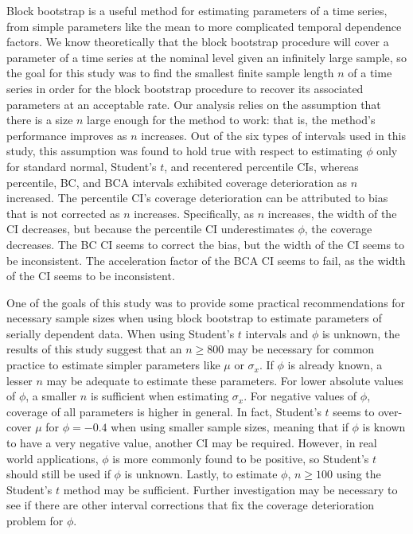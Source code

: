 \documentclass[10pt]{article}
\begin{document}
Block bootstrap is a useful method for estimating parameters of a time series,
from simple parameters like the mean to more complicated temporal dependence
factors. We know theoretically that the block bootstrap procedure will cover a 
parameter of a time series at the nominal level given an infinitely large 
sample, \citep{calhoun2018} so the goal for this study was to find the smallest 
finite sample length 
$n$ of a time series in order for the block bootstrap procedure to recover its 
associated parameters at an acceptable rate. Our analysis relies on the 
assumption that there is a size $n$ large enough for the method to work: that 
is, the method's performance improves as $n$ increases. Out of the six types of 
intervals used in this study, this assumption was found to hold true with 
respect to estimating $\phi$ only for standard normal, Student's $t$, and recentered 
percentile CIs, whereas percentile, BC, and BCA intervals exhibited coverage 
deterioration as $n$ increased. The percentile CI's coverage deterioration can 
be attributed to bias that is not corrected as $n$ increases. Specifically, as 
$n$ increases, the width of the CI decreases, but because the percentile CI 
underestimates $\phi$, the coverage decreases. The BC CI seems to correct the 
bias, but the width of the CI seems to be inconsistent. The acceleration factor 
of the BCA CI seems to fail, as the width of the CI seems to be inconsistent. 


One of the goals of this study was to provide some practical recommendations for 
necessary sample sizes when using block bootstrap to estimate parameters of 
serially dependent data. When using Student's $t$ intervals and $\phi$ is 
unknown, the results of this study suggest that an $n \geq 800$ may be necessary 
for common practice to estimate simpler parameters like $\mu$ or $\sigma_x$. If 
$\phi$ is already known, a lesser $n$ may be adequate to estimate these 
parameters. For lower absolute values of $\phi$, a smaller $n$ is sufficient 
when estimating $\sigma_x$. For negative values of $\phi$, coverage of all 
parameters is higher in general. In fact, Student's $t$ seems to over-cover 
$\mu$ for $\phi = - 0.4$ when using smaller sample sizes, meaning that if $\phi$ 
is known to have a very negative value, another CI may be required. However, in 
real world applications, $\phi$ is more commonly found to be positive, so 
Student's $t$ should still be used if $\phi$ is unknown. Lastly, to estimate 
$\phi$, $n \geq 100$ using the Student's $t$ method may be sufficient. Further
investigation may be necessary to see if there are other interval corrections
that fix the coverage deterioration problem for $\phi$.
\end{document}
